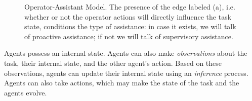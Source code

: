 \documentclass[12pt,a4paper]{article}
\begin{document}
\begin{figure}[H]
{
}
\caption{Operator-Assistant Model. The presence of the edge labeled (a), i.e. whether or not the operator actions will directly influence the task state, conditions the type of assistance: in case it exists, we will talk of proactive assistance; if not we will talk of supervisory assistance.\label{fig:opass}}
\end{figure}

Agents possess an internal state. Agents can also make \emph{observations} about the task, their internal state, and the other agent's action. Based on these observations, agents can update their internal state using an \emph{inference} process. Agents can also take actions, which may make the state of the task and the agents evolve.
\end{document}
